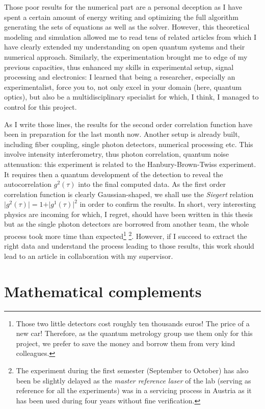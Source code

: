\documentclass[11pt]{report}
\begin{document}
Those poor results for the numerical part are a personal deception as I have spent a certain amount of energy writing and optimizing the full algorithm generating the sets of equations as well as the solver. However, this theoretical modeling and simulation allowed me to read tens of related articles from which I have clearly extended my understanding on open quantum systems and their numerical approach. Similarly, the experimentation brought me to edge of my previous capacities, thus enhanced my skills in experimental setup, signal processing and electronics: I learned that being a researcher, especially an experimentalist, force you to, not only excel in your domain (here, quantum optics), but also be a multidisciplinary specialist for which, I think, I managed to control for this project.

As I write those lines, the results for the second order correlation function have been in preparation for the last month now. Another setup is already built, including fiber coupling, single photon detectors, numerical processing etc. This involve intensity interferometry, thus photon correlation, quantum noise attenuation: this experiment is related to the Hanbury-Brown-Twiss experiment. It requires then a quantum development of the detection to reveal the autocorrelation $g^2(\tau)$ into the final computed data. As the first order correlation function is clearly Gaussian-shaped, we shall use the \textit{Siegert} relation $\vert g^2(\tau) \vert = 1 + \vert g^1(\tau) \vert^2$ in order to confirm the results. In short, very interesting physics are incoming for which, I regret, should have been written in this thesis but as the single photon detectors are borrowed from another team, the whole process took more time than expected\footnote{Those two little detectors cost roughly ten thousands euros! The price of a new car! Therefore, as the quantum metrology group use them only for this project, we prefer to save the money and borrow them from very kind colleagues.} \footnote{The experiment during the first semester (September to October) has also been be slightly delayed as the \textit{master reference laser} of the lab (serving as reference for all the experiments) was in a servicing process in Austria as it has been used during four years without fine verification.}. However, if I succeed to extract the right data and understand the process leading to those results, this work should lead to an article in collaboration with my supervisor.

\appendix
\chapter{Mathematical complements}
\end{document}
